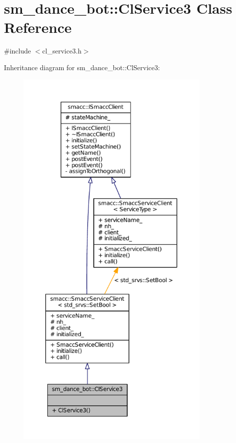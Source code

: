 \hypertarget{classsm__dance__bot_1_1ClService3}{}\section{sm\+\_\+dance\+\_\+bot\+:\+:Cl\+Service3 Class Reference}
\label{classsm__dance__bot_1_1ClService3}


{\ttfamily \#include $<$cl\+\_\+service3.\+h$>$}



Inheritance diagram for sm\+\_\+dance\+\_\+bot\+:\+:Cl\+Service3\+:
\nopagebreak
\begin{figure}[H]
\begin{center}
\leavevmode
\includegraphics[height=550pt]{classsm__dance__bot_1_1ClService3__inherit__graph}
\end{center}
\end{figure}


